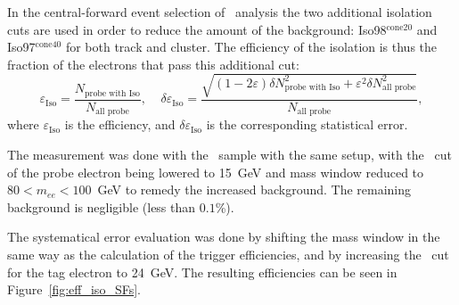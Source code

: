 In the central-forward event selection of \Zee\ analysis the two additional isolation cuts are used in order to reduce the amount of the background: Iso98\et$^{\mathrm{cone20}}$ and Iso97\pt$^{\mathrm{cone40}}$ for both track and cluster. The efficiency of the isolation is thus the fraction of the electrons that pass this additional cut:
\begin{equation}
\varepsilon_\mathrm{Iso} = \frac{N_\text{probe with Iso} }{ N_\text{all probe} }, \;\;\;\;
\delta \varepsilon_\mathrm{Iso} = \frac{\sqrt{(1-2\varepsilon) \delta N_\text{probe with Iso}^2 + \varepsilon^2 \delta N_\text{all probe}^2}}
                                {N_\text{all probe}},
\end{equation}
where $\varepsilon_\mathrm{Iso}$ is the efficiency, and $\delta \varepsilon_\mathrm{Iso}$ is the corresponding statistical error.

The measurement was done with the \Zee\ sample with the same setup, with the \pt\ cut of the probe electron being lowered to 15~GeV and mass window reduced to $80 < m_{ee} < 100$~GeV to remedy the increased background. The remaining background is negligible (less than $0.1$\%).

The systematical error evaluation was done by shifting the mass window in the same way as the calculation of the trigger efficiencies, and by increasing the \pt\ cut for the tag electron to 24~GeV. The resulting efficiencies can be seen in Figure~\ref{fig:eff_iso_SFs}.

\begin{figure}
\end{figure}
